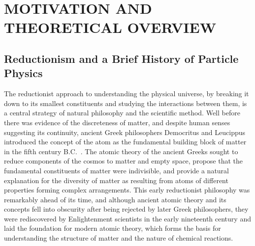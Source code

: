 
\chapter{MOTIVATION AND THEORETICAL OVERVIEW}
\label{Motivation_and_Theoretical_Overview}

\section{Reductionism and a Brief History of Particle Physics}
The reductionist approach to understanding the physical universe, by breaking it down to its smallest constituents and studying the interactions between them, is a central strategy of natural philosophy and the scientific method.
Well before there was evidence of the discreteness of matter, and despite human senses suggesting its continuity, ancient Greek philosophers Democritus and Leucippus introduced the concept of the atom as the fundamental building block of matter in the fifth century B.C.~\cite{sep-atomism-ancient}.
The atomic theory of the ancient Greeks sought to reduce components of the cosmos to matter and empty space, propose that the fundamental constituents of matter were indivisible, and provide a natural explanation for the diversity of matter as resulting from atoms of different properties forming complex arrangements.
This early reductionist philosophy was remarkably ahead of its time, and although ancient atomic theory and its concepts fell into obscurity after being rejected by later Greek philosophers, they were rediscovered by Enlightenment scientists in the early nineteenth century and laid the foundation for modern atomic theory, which forms the basis for understanding the structure of matter and the nature of chemical reactions.


